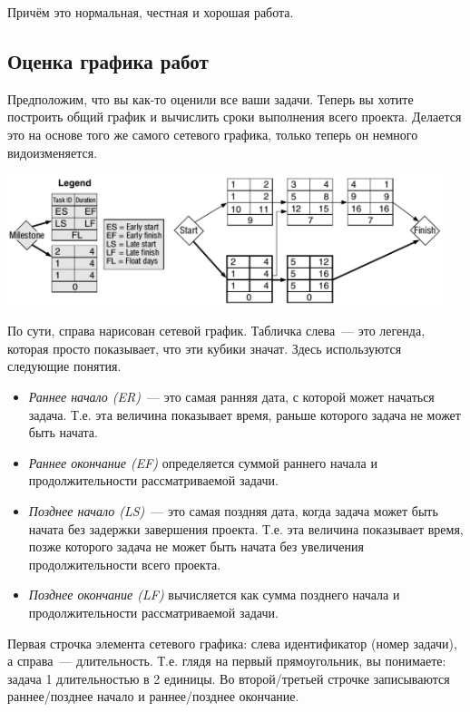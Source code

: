 \documentclass{../../text-style}
\begin{document}
Причём это нормальная, честная и хорошая работа.

\subsection{Оценка графика работ}

Предположим, что вы как-то оценили все ваши задачи. Теперь вы хотите построить общий график и вычислить сроки выполнения всего проекта. Делается это на основе того же самого сетевого графика, только теперь он немного видоизменяется.

\begin{center}
    \includegraphics[width=0.95\textwidth]{graphEstimate.png}
\end{center}

По сути, справа нарисован сетевой график. Табличка слева~--- это легенда, которая просто показывает, что эти кубики значат. Здесь используются следующие понятия.

\begin{itemize}
    \item \emph{Раннее начало (ER)}~--- это самая ранняя дата, с которой может начаться задача. Т.е. эта величина показывает время, раньше которого задача не может быть начата.
    \item \emph{Раннее окончание (EF)} определяется суммой раннего начала и продолжительности рассматриваемой задачи.
    \item \emph{Позднее начало (LS)}~--- это самая поздняя дата, когда задача может быть начата без задержки завершения проекта. Т.е. эта величина показывает время, позже которого задача не может быть начата без увеличения продолжительности всего проекта.
    \item \emph{Позднее окончание (LF)} вычисляется как сумма позднего начала и продолжительности рассматриваемой задачи.
\end{itemize}

Первая строчка элемента сетевого графика: слева идентификатор (номер задачи), а справа~--- длительность. Т.е. глядя на первый прямоугольник, вы понимаете: задача 1 длительностью в 2 единицы. Во второй/третьей строчке записываются раннее/позднее начало и раннее/позднее окончание.
\end{document}
